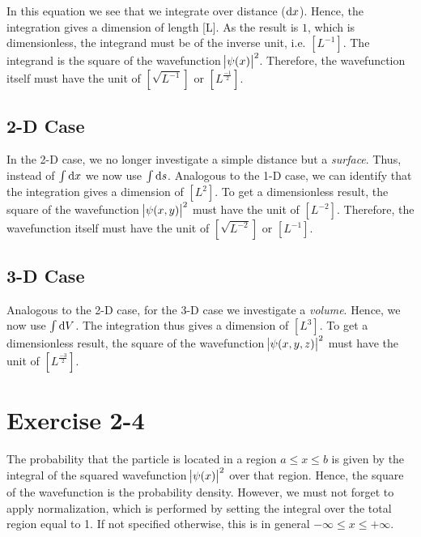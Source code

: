 In this equation we see that we integrate over distance ($\dif x$). Hence,
the integration gives a dimension of length [L]. As the result is $1$,
which is dimensionless, the integrand must be of the inverse
unit, i.e. $[L^{-1}]$. The integrand is the square of the wavefunction
$\abs{\psi(x)}^2$. Therefore, the wavefunction itself must have the unit of
$[\sqrt{L^{-1}}]$ or $[L^{\frac{-1}{2}}]$.

\subsection{2-D Case}
In the 2-D case, we no longer investigate a simple distance but a \emph{surface}.
Thus, instead of $\int \dif x$ we now use $\int \dif s$. Analogous to the
1-D case, we can identify that the integration gives a dimension of $[L^2]$.
To get a dimensionless result, the square of the wavefunction
$\abs{\psi(x,y)}^2$ must have the unit of $[L^{-2}]$. Therefore, the
wavefunction itself must have the unit of $[\sqrt{L^{-2}}]$ or $[L^{-1}]$.

\subsection{3-D Case}
Analogous to the 2-D case, for the 3-D case we investigate a \emph{volume}.
Hence, we now use $\int \dif V$. The integration thus gives a dimension of
$[L^3]$. To get a dimensionless result, the square of the wavefunction
$\abs{\psi(x,y,z)}^2$ must have the unit of $[L^{\frac{-3}{2}}]$.


\newpage
\section{Exercise 2-4}
The probability that the particle is located in a region $a \leq x \leq b$ is
given by the integral of the squared wavefunction $\abs{\psi(x)}^2$ over that
region. Hence, the square of the wavefunction is the probability density.
However, we must not forget to apply normalization, which is performed by
setting the integral over the total region equal to 1. If not specified
otherwise, this is in general $-\infty \leq x \leq +\infty$.

